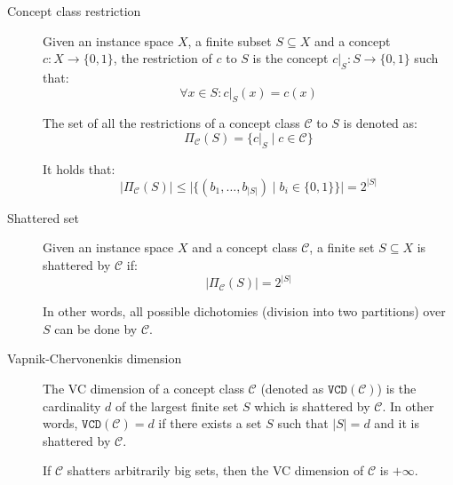 \begin{description}
    \item[Concept class restriction] 
        Given an instance space $X$, a finite subset $S \subseteq X$ and a concept $c: X \rightarrow \{0,1\}$, 
        the restriction of $c$ to $S$ is the concept $c|_{S}: S \rightarrow \{0, 1\}$ such that:
        \[ \forall x \in S: c|_{S}(x) = c(x) \]

        The set of all the restrictions of a concept class $\mathcal{C}$ to $S$ is denoted as:
        \[ \Pi_\mathcal{C}(S) = \{ c|_{S} \mid c \in \mathcal{C} \} \]

        \begin{remark}
            It holds that:
            \[ \big\vert \Pi_\mathcal{C}(S) \big\vert \leq \big\vert \{ (b_1, \dots, b_{\vert S \vert}) \mid b_i \in \{0,1\} \} \big\vert = 2^{\vert S \vert} \]
        \end{remark}



    \item[Shattered set] 
        Given an instance space $X$ and a concept class $\mathcal{C}$,
        a finite set $S \subseteq X$ is shattered by $\mathcal{C}$ if:
        \[ \vert \Pi_\mathcal{C}(S) \vert = 2^{\vert S \vert} \]

        In other words, all possible dichotomies (division into two partitions) over $S$ can be done by $\mathcal{C}$.


    \item[Vapnik-Chervonenkis dimension] 
        The VC dimension of a concept class $\mathcal{C}$ (denoted as $\texttt{VCD}(\mathcal{C})$) is 
        the cardinality $d$ of the largest finite set $S$ which is shattered by $\mathcal{C}$.
        In other words, $\texttt{VCD}(\mathcal{C}) = d$ if there exists a set $S$ such that $\vert S \vert = d$
        and it is shattered by $\mathcal{C}$.

        If $\mathcal{C}$ shatters arbitrarily big sets, then the VC dimension of $\mathcal{C}$ is $+\infty$.
\end{description}


